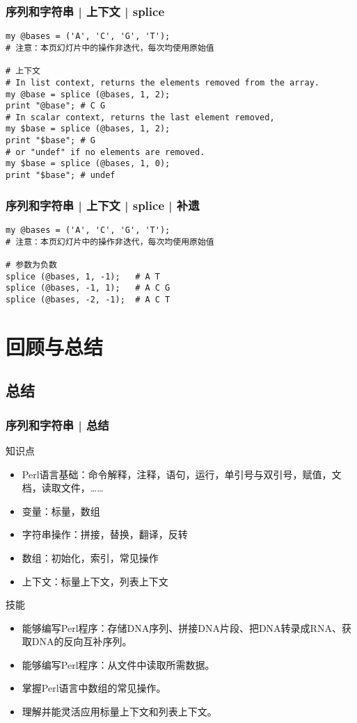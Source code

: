 \begin{frame}[fragile]
  \frametitle{序列和字符串 | 上下文 | splice}
\begin{lstlisting}
my @bases = ('A', 'C', 'G', 'T');
# 注意：本页幻灯片中的操作非迭代，每次均使用原始值

# 上下文
# In list context, returns the elements removed from the array.
my @base = splice (@bases, 1, 2);
print "@base"; # C G
# In scalar context, returns the last element removed,
my $base = splice (@bases, 1, 2);
print "$base"; # G
# or "undef" if no elements are removed.
my $base = splice (@bases, 1, 0);
print "$base"; # undef
\end{lstlisting}
\end{frame}

\begin{frame}[fragile]
  \frametitle{序列和字符串 | 上下文 | splice | 补遗}
\begin{lstlisting}
my @bases = ('A', 'C', 'G', 'T');
# 注意：本页幻灯片中的操作非迭代，每次均使用原始值

# 参数为负数
splice (@bases, 1, -1);   # A T
splice (@bases, -1, 1);   # A C G
splice (@bases, -2, -1);  # A C T
\end{lstlisting}
\end{frame}


\section{回顾与总结}
\subsection{总结}
\begin{frame}
  \frametitle{序列和字符串 | 总结}
  \begin{block}{知识点}
    \begin{itemize}
      \item Perl语言基础：命令解释，注释，语句，运行，单引号与双引号，赋值，文档，读取文件，……
      \item 变量：标量，数组
      \item 字符串操作：拼接，替换，翻译，反转
      \item 数组：初始化，索引，常见操作
      \item 上下文：标量上下文，列表上下文
    \end{itemize}
  \end{block}
  \pause
  \begin{block}{技能}
    \begin{itemize}
      \item 能够编写Perl程序：存储DNA序列、拼接DNA片段、把DNA转录成RNA、获取DNA的反向互补序列。
      \item 能够编写Perl程序：从文件中读取所需数据。
      \item 掌握Perl语言中数组的常见操作。
      \item 理解并能灵活应用标量上下文和列表上下文。
    \end{itemize}
  \end{block}
\end{frame}


